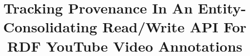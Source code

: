 \documentclass{acm_proc_article-sp}
\begin{document}
\title{Tracking Provenance In An Entity-Consolidating Read/Write API For RDF YouTube Video Annotations}
%
%
%
%
%
\end{document}
